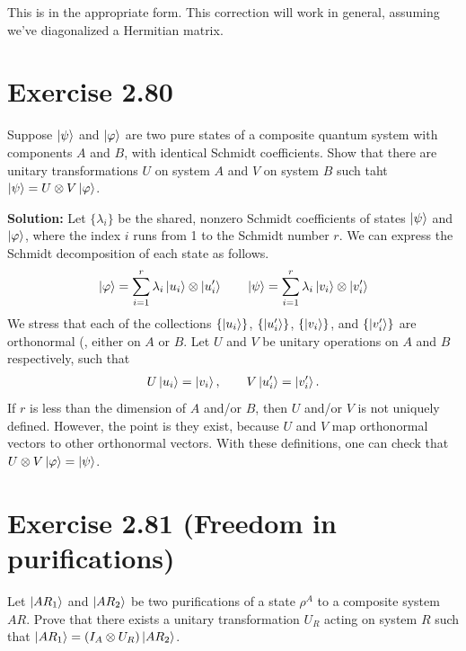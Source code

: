 \documentclass{book}
\begin{document}
    This is in the appropriate form. This correction will work in general, assuming we've diagonalized a Hermitian matrix. 

\section*{Exercise 2.80}
    Suppose $\ket{\psi}$ and $\ket{\varphi}$ are two pure states of a composite quantum system with components $A$ and $B$, with identical Schmidt coefficients. Show that there are unitary transformations $U$ on system $A$ and $V$ on system $B$ such taht $\ket{\psi} = U \otimes V \ket{\varphi}$.

    \textbf{Solution:} Let $\{\lambda_i\}$ be the shared, nonzero Schmidt coefficients of states $\ket{\psi}$ and $\ket{\varphi}$, where the index $i$ runs from 1 to the Schmidt number $r$. We can express the Schmidt decomposition of each state as follows.
    \begin{align}
        \ket{\varphi} = \sum_{i=1}^r \lambda_i \ket{u_i}\otimes \ket{u_i'} \qquad \ket{\psi} = \sum_{i=1}^r \lambda_i \ket{v_i}\otimes \ket{v_i'}
    \end{align}
    We stress that each of the collections $\{\ket{u_i}\}$, $\{\ket{u_i'}\}$, $\{\ket{v_i}\}$, and $\{\ket{v_i'}\}$ are orthonormal (, either on $A$ or $B$. Let $U$ and $V$ be unitary operations on $A$ and $B$ respectively, such that 
    \begin{align}
         U \ket{u_i} = \ket{v_i}, \qquad V \ket{u_i'} = \ket{v_i'}.
    \end{align}
    If $r$ is less than the dimension of $A$ and/or $B$, then $U$ and/or $V$ is not uniquely defined. However, the point is they exist, because $U$ and $V$ map orthonormal vectors to other orthonormal vectors. With these definitions, one can check that $U \otimes V \ket{\varphi} = \ket{\psi}$.

\section*{Exercise 2.81 (Freedom in purifications)}
    Let $\ket{A R_1}$ and $\ket{A R_2}$ be two purifications of a state $\rho^A$ to a composite system $AR$. Prove that there exists a unitary transformation $U_R$ acting on system $R$ such that $\ket{A R_1} = (I_A \otimes U_R) \ket{A R_2}$.
\end{document}
